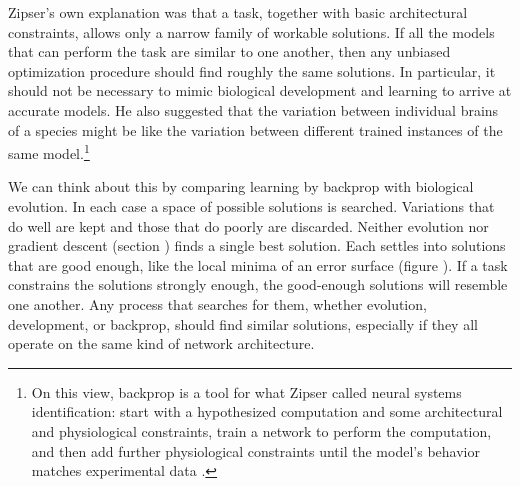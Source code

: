 Zipser's own explanation was that a task, together with basic architectural constraints, allows only a narrow family of workable solutions. If all the models that can perform the task are similar to one another, then any unbiased optimization procedure should find roughly the same solutions. In particular, it should not be necessary to mimic biological development and learning to arrive at accurate models. He also suggested that the variation between individual brains of a species might be like the variation between different trained instances of the same model.\footnote{On this view, backprop is a tool for what Zipser called neural systems identification: start with a hypothesized computation and some architectural and physiological constraints, train a network to perform the computation, and then add further physiological constraints until the model's behavior matches experimental data \cite{zipser1992identification}.}

We can think about this by comparing learning by backprop with biological evolution.  In each case a space of possible solutions is searched. Variations that do well are kept and those that do poorly are discarded. Neither evolution nor gradient descent (section ) finds a single best solution. Each settles into solutions that are good enough, like the local minima of an error surface (figure ). If a task constrains the solutions strongly enough, the good-enough solutions will resemble one another. Any process that searches for them, whether evolution, development, or backprop, should  find similar solutions, especially if they all operate on the same kind of network architecture.

